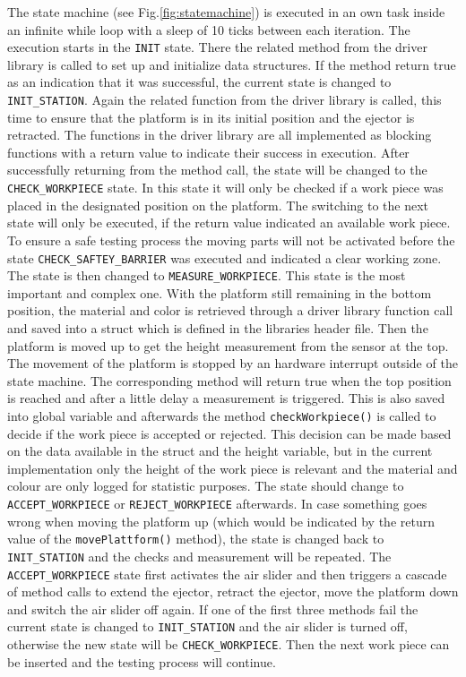 The state machine (see Fig.\ref{fig:statemachine}) is executed in an own task inside an infinite while loop with a sleep of 10 ticks between each iteration. The execution starts in the \texttt{INIT} state. There the related method from the driver library is called to set up and initialize data structures. If the method return true as an indication that it was successful, the current state is changed to \texttt{INIT\_STATION}. Again the related function from the driver library is called, this time to ensure that the platform is in its initial position and the ejector is retracted. The functions in the driver library are all implemented as blocking functions with a return value to indicate their success in execution. After successfully returning from the method call, the state will be changed to the \texttt{CHECK\_WORKPIECE} state. In this state it will only be checked if a work piece was placed in the designated position on the platform. The switching to the next state will only be executed, if the return value indicated an available work piece.
To ensure a safe testing process the moving parts will not be activated before the state \texttt{CHECK\_SAFTEY\_BARRIER} was executed and indicated a clear working zone. The state is then changed to \texttt{MEASURE\_WORKPIECE}. This state is the most important and complex one. With the platform still remaining in the bottom position, the material and color is retrieved through a driver library function call and saved into a struct which is defined in the libraries header file. Then the platform is moved up to get the height measurement from the sensor at the top. The movement of the platform is stopped by an hardware interrupt outside of the state machine. The corresponding method will return true when the top position is reached and after a little delay a measurement is triggered. This is also saved into global variable and afterwards the method \texttt{checkWorkpiece()} is called to decide if the work piece is accepted or rejected. This decision can be made based on the data available in the struct and the height variable, but in the current implementation only the height of the work piece is relevant and the material and colour are only logged for statistic purposes. The state should change to \texttt{ACCEPT\_WORKPIECE} or \texttt{REJECT\_WORKPIECE} afterwards. In case something goes wrong when moving the platform up (which would be indicated by the return value of the \texttt{movePlattform()} method), the state is changed back to \texttt{INIT\_STATION} and the checks and measurement will be repeated.
The \texttt{ACCEPT\_WORKPIECE} state first activates the air slider and then triggers a cascade of method calls to extend the ejector, retract the ejector, move the platform down and switch the air slider off again. If one of the first three methods fail the current state is changed to \texttt{INIT\_STATION} and the air slider is turned off, otherwise the new state will be \texttt{CHECK\_WORKPIECE}. Then the next work piece can be inserted and the testing process will continue.
